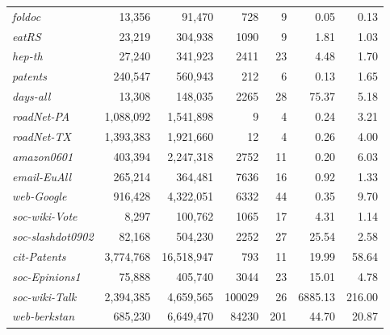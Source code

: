 \begin{table}[!hbt]
\begin{tabular}{lrrrr|rr}
{\it foldoc}	&	13,356	&	91,470	&	728	&	9	&	0.05	&	0.13	\\
{\it eatRS}	&	23,219	&	304,938	&	1090	&	9	&	1.81	&	1.03	\\
{\it hep-th}	&	27,240	&	341,923	&	2411	&	23	&	4.48	&	1.70	\\
{\it patents}	&	240,547	&	560,943	&	212	&	6	&	0.13	&	1.65	\\
{\it days-all}	&	13,308	&	148,035	&	2265	&	28	&	75.37	&	5.18	\\
{\it roadNet-PA}	&	1,088,092	&	1,541,898	&	9	&	4	&	0.24	&	3.21	\\
{\it roadNet-TX}	&	1,393,383	&	1,921,660	&	12	&	4	&	0.26	&	4.00	\\
{\it amazon0601}	&	403,394	&	2,247,318	&	2752	&	11	&	0.20	&	6.03	\\
{\it email-EuAll}	&	265,214	&	364,481	&	7636	&	16	&	0.92	&	1.33	\\
{\it web-Google}	&	916,428	&	4,322,051	&	6332	&	44	&	0.35	&	9.70	\\
{\it soc-wiki-Vote}	&	8,297	&	100,762	&	1065	&	17	&	4.31	&	1.14	\\
{\it soc-slashdot0902}	&	82,168	&	504,230	&	2252	&	27	&	25.54	&	2.58	\\
{\it cit-Patents}	&	3,774,768	&	16,518,947	&	793	&	11	&	19.99	&	58.64	\\
{\it soc-Epinions1}	&	75,888	&	405,740	&	3044	&	23	&	15.01	&	4.78	\\
{\it soc-wiki-Talk}	&	2,394,385	&	4,659,565	&	100029	&	26	&	6885.13	&	216.00	\\
{\it web-berkstan}	&	685,230	&	6,649,470	&	84230	&	201	&	44.70	&	20.87	\\
\bottomrule\bottomrule
\end{tabular}
\end{table}

